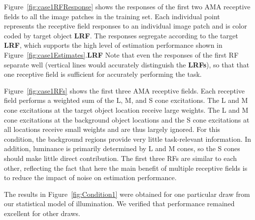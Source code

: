 \documentclass{jov}
\providecommand{\DIFaddtex}[1]{{\bf #1}} %
\providecommand{\DIFdeltex}[1]{} %
\providecommand{\DIFaddbegin}{} %
\providecommand{\DIFaddend}{} %
\providecommand{\DIFdelbegin}{} %
\providecommand{\DIFdelend}{} %
\providecommand{\DIFadd}[1]{\texorpdfstring{\DIFaddtex{#1}}{#1}} %
\providecommand{\DIFdel}[1]{\texorpdfstring{\DIFdeltex{#1}}{}} %
\newcommand{\DIFscaledelfig}{0.5}
\newlength{\DIFdelgraphicswidth} %
\newlength{\DIFdelgraphicsheight} %
\newcommand{\DIFaddincludegraphics}[2][]{{\color{blue}\fbox{\DIFOincludegraphics[#1]{#2}}}} %
\newcommand{\DIFdelincludegraphics}[2][]{%
\sbox{\DIFdelgraphicsbox}{\DIFOincludegraphics[#1]{#2}}%
\settoboxwidth{\DIFdelgraphicswidth}{\DIFdelgraphicsbox} %
\settoboxtotalheight{\DIFdelgraphicsheight}{\DIFdelgraphicsbox} %
\scalebox{\DIFscaledelfig}{%
\parbox[b]{\DIFdelgraphicswidth}{\usebox{\DIFdelgraphicsbox}\\[-\baselineskip] \rule{\DIFdelgraphicswidth}{0em}}\llap{\resizebox{\DIFdelgraphicswidth}{\DIFdelgraphicsheight}{%
\setlength{\unitlength}{\DIFdelgraphicswidth}%
\begin{picture}(1,1)%
\thicklines\linethickness{2pt} %
{\color[rgb]{1,0,0}\put(0,0){\framebox(1,1){}}}%
{\color[rgb]{1,0,0}\put(0,0){\line( 1,1){1}}}%
{\color[rgb]{1,0,0}\put(0,1){\line(1,-1){1}}}%
\end{picture}%
}\hspace*{3pt}}} %
} %
\DeclareRobustCommand{\DIFaddbegin}{\DIFOaddbegin \let\includegraphics\DIFaddincludegraphics} %
\DeclareRobustCommand{\DIFaddend}{\DIFOaddend \let\includegraphics\DIFOincludegraphics} %
\DeclareRobustCommand{\DIFdelbegin}{\DIFOdelbegin \let\includegraphics\DIFdelincludegraphics} %
\DeclareRobustCommand{\DIFdelend}{\DIFOaddend \let\includegraphics\DIFOincludegraphics} %
\begin{document}
Figure~\ref{fig:case1RFResponse} shows the responses of the first two AMA receptive fields to all the image patches in the training set.
Each individual point represents the receptive field responses to an individual image patch and
is color coded by target object \DIFdelbegin \DIFdel{LRV}\DIFdelend \DIFaddbegin \DIFadd{LRF}\DIFaddend .
The responses segregate according to the target \DIFdelbegin \DIFdel{LRV}\DIFdelend \DIFaddbegin \DIFadd{LRF}\DIFaddend , which supports the high level 
of estimation performance shown in Figure~\ref{fig:case1Estimates}.\DIFaddbegin \DIFadd{LRF
}\DIFaddend Note that even the responses of the first RF separate well (vertical lines would accurately
distinguish the \DIFdelbegin \DIFdel{LRVs}\DIFdelend \DIFaddbegin \DIFadd{LRFs}\DIFaddend ), so that that one receptive field is sufficient for accurately performing the task.

Figure~\ref{fig:case1RFs} shows the first three AMA receptive fields.
Each receptive field performs a weighted sum of the L, M, and S cone excitations.
The L and M cone excitations at the target object location receive large weights.
The L and M cone excitations at the background object locations and the S cone excitations at all locations receive small weights and are thus largely ignored. 
For this condition, the background regions provide very little task-relevant information. 
In addition, luminance is primarily determined by L and M cones, so the S cones should make little
direct contribution.
The first three RFs are similar to each other, reflecting the fact that here the main benefit
of multiple receptive fields is to reduce the impact of noise on estimation performance.

The results in Figure~\ref{fig:Condition1} were obtained for one particular draw from our statistical model of illumination.
We verified that performance remained excellent for other draws.
\end{document}

